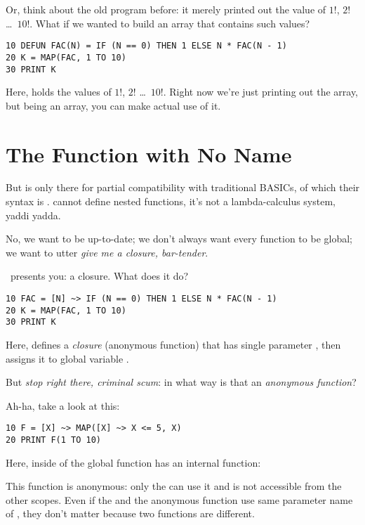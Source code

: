 Or, think about the old  program before: it merely printed out the value of $1!$, $2!$ \ldots\ $10!$. What if we wanted to build an array that contains such values?

\begin{lstlisting}
10 DEFUN FAC(N) = IF (N == 0) THEN 1 ELSE N * FAC(N - 1)
20 K = MAP(FAC, 1 TO 10)
30 PRINT K
\end{lstlisting}

Here,  holds the values of $1!$, $2!$ \ldots\ $10!$. Right now we're just printing out the array, but being an array, you can make actual use of it.

\section[Closure]{The Function with No Name}

But  is only there for partial compatibility with traditional BASICs, of which their syntax is .  cannot define nested functions, it's not a lambda-calculus system, yaddi yadda.

No, we want to be up-to-date; we don't always want every function to be global; we want to utter \emph{give me a closure, bar-tender}.

\tbas\ presents you: a closure. What does it do?

\begin{lstlisting}
10 FAC = [N] ~> IF (N == 0) THEN 1 ELSE N * FAC(N - 1)
20 K = MAP(FAC, 1 TO 10)
30 PRINT K
\end{lstlisting}

Here, \code{[N]\basicclosure\,\ldots} defines a \emph{closure} (anonymous function) that has single parameter , then assigns it to global variable .

But \emph{stop right there, criminal scum}: in what way is that an \emph{anonymous function}?

Ah-ha, take a look at this:

\begin{lstlisting}
10 F = [X] ~> MAP([X] ~> X <= 5, X)
20 PRINT F(1 TO 10)
\end{lstlisting}

Here,  inside of the global function  has an internal function: 

This function is anonymous: only the  can use it and is not accessible from the other scopes. Even if the  and the anonymous function use same parameter name of , they don't matter because two functions are different.

